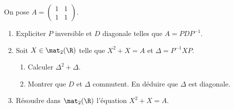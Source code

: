 \begin{enonce}
\begin{exercise}[ID={RMS135 E1409},subtitle={IMT MP 2024},tags={},difficulty={}]
On pose $A = \begin{pmatrix} 1 & 1 \\ 1 & 1 \end{pmatrix}$.
\begin{enumerate}
  \item Expliciter $P$ inversible et $D$ diagonale telles que $A = P D P^{-1}$.
  \item Soit $X \in \mat_2(\R)$ telle que $X^2 + X = A$ et $\Delta = P^{-1} X P$.
  \begin{enumerate}
    \item Calculer $\Delta^2 + \Delta$.
    \item Montrer que $D$ et $\Delta$ commutent. En déduire que $\Delta$ est diagonale.
  \end{enumerate}
  \item Résoudre dans $\mat_2(\R)$ l’équation $X^2 + X = A$.
\end{enumerate}
\end{exercise}
\begin{solution}
\end{solution}
\end{enonce}
